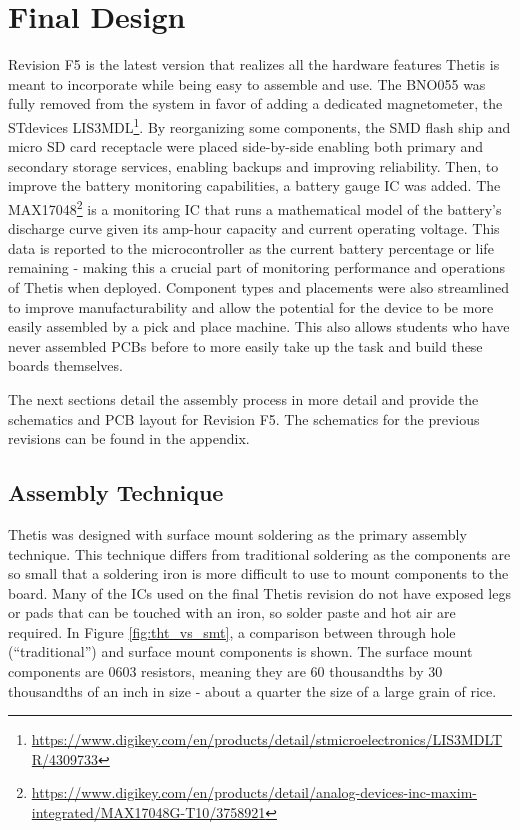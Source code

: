 
\section{Final Design} 
Revision F5 is the latest version that realizes all the hardware features Thetis is meant to incorporate while being easy to assemble and use.
The BNO055 was fully removed from the system in favor of adding a dedicated magnetometer, the STdevices LIS3MDL\footnote{\url{https://www.digikey.com/en/products/detail/stmicroelectronics/LIS3MDLTR/4309733}}.
By reorganizing some components, the SMD flash ship and micro SD card receptacle were placed side-by-side enabling both primary and secondary storage services, enabling backups and improving reliability.
Then, to improve the battery monitoring capabilities, a battery gauge IC was added.
The MAX17048\footnote{\url{https://www.digikey.com/en/products/detail/analog-devices-inc-maxim-integrated/MAX17048G-T10/3758921}} is a monitoring IC that runs a mathematical model of the battery's discharge curve given its amp-hour capacity and current operating voltage.
This data is reported to the microcontroller as the current battery percentage or life remaining - making this a crucial part of monitoring performance and operations of Thetis when deployed.
Component types and placements were also streamlined to improve manufacturability and allow the potential for the device to be more easily assembled by a pick and place machine.
This also allows students who have never assembled PCBs before to more easily take up the task and build these boards themselves.


The next sections detail the assembly process in more detail and provide the schematics and PCB layout for Revision F5.
The schematics for the previous revisions can be found in the appendix.



\subsection{Assembly Technique} 
Thetis was designed with surface mount soldering as the primary assembly technique.
This technique differs from traditional soldering as the components are so small that a soldering iron is more difficult to use to mount components to the board.
Many of the ICs used on the final Thetis revision do not have exposed legs or pads that can be touched with an iron, so solder paste and hot air are required.
In Figure \ref{fig:tht_vs_smt}, a comparison between through hole (``traditional'') and surface mount components is shown.
The surface mount components are 0603 resistors, meaning they are 60 thousandths by 30 thousandths of an inch in size - about a quarter the size of a large grain of rice.

